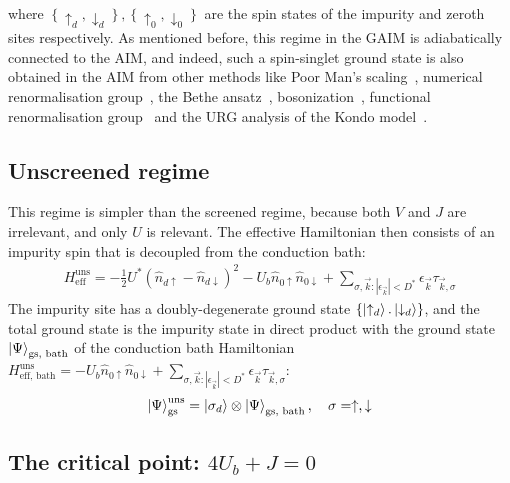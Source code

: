 \documentclass[reprint,superscriptaddress,floatfix]{revtex4-2}
\begin{document}
where \(\left\{\uparrow_d, \downarrow_d\right\}, \left\{\uparrow_0, \downarrow_0\right\}\) are the spin states of the impurity and zeroth sites respectively. As mentioned before, this regime in the GAIM is adiabatically connected to the AIM, and indeed, such a spin-singlet ground state is also obtained in the AIM from other methods like Poor Man's scaling~\cite{anderson1969exact,anderson1970}, numerical renormalisation group~\cite{wilson1975,hrk_wilson_1980}, the Bethe ansatz~\cite{andrei_1980,andreiKondoreview,Wiegmann_1981,tsvelickKondoreview}, bosonization~\cite{kotliar_1996,Duki_2011,borda_2008}, functional renormalisation group~\cite{streib_2013} and the URG analysis of the Kondo model~\cite{anirban_kondo}.

\subsection{Unscreened regime}

This regime is simpler than the screened regime, because both \(V\) and \(J\) are irrelevant, and only \(U\) is relevant. The effective Hamiltonian then consists of an impurity spin that is decoupled from the conduction bath:
\begin{equation}\begin{aligned}
	H_\text{eff}^\text{uns} = -\frac{1}{2}U^*\left(\hat n_{d \uparrow} - \hat n_{d \downarrow}\right)^2 - U_b \hat n_{0 \uparrow} \hat n_{0 \downarrow} + \sum_{\sigma,\vec k:|\epsilon_{\vec k}| < D^*} \epsilon_{\vec k} \tau_{\vec k,\sigma}
\end{aligned}\end{equation}
The impurity site has a doubly-degenerate ground state \(\left\{ \ket{\uparrow_d}.\ket{\downarrow_d}\right\}\), and the total ground state is the impurity state in direct product with the ground state \(\ket{\Psi}_\text{gs, bath}\) of the conduction bath Hamiltonian \(H_\text{eff, bath}^\text{uns} =  - U_b \hat n_{0 \uparrow} \hat n_{0 \downarrow} + \sum_{\sigma,\vec k:|\epsilon_{\vec k}| < D^*} \epsilon_{\vec k} \tau_{\vec k,\sigma}\):
\begin{equation}\begin{aligned}
	\ket{\Psi}_\text{gs}^\text{uns} = \ket{\sigma_d}\otimes\ket{\Psi}_\text{gs, bath}, ~ ~ ~ \sigma = \uparrow,\downarrow
\end{aligned}\end{equation}

\subsection{The critical point: \(4U_b + J = 0\)}
\end{document}
